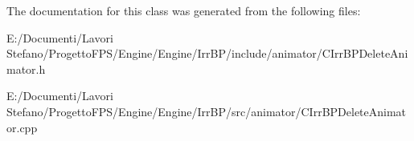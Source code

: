 The documentation for this class was generated from the following files:\begin{DoxyCompactItemize}
\item 
E:/Documenti/Lavori Stefano/ProgettoFPS/Engine/Engine/IrrBP/include/animator/CIrrBPDeleteAnimator.h\item 
E:/Documenti/Lavori Stefano/ProgettoFPS/Engine/Engine/IrrBP/src/animator/CIrrBPDeleteAnimator.cpp\end{DoxyCompactItemize}
